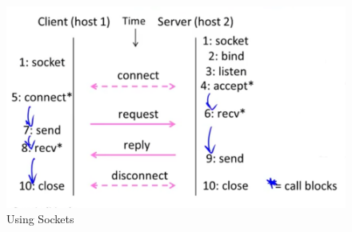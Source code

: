 \documentclass[12pt]{ctexart}   %
\begin{document}
	 \begin{figure}[h!] %
	 \centering
	 \includegraphics[scale=1.0]{images/1-4-3}
	\caption{ Using Sockets }
	 \label{fig:1-4-3}
	 \end{figure}
	 
\end{document}
